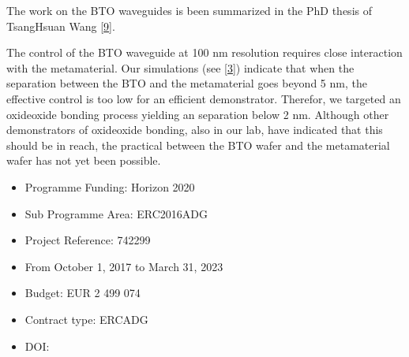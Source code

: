\documentclass[a4paper,10pt,english,openany,oneside]{jupyterBook}
\begin{document}
\sphinxAtStartPar
The work on the BTO waveguides is been summarized in the PhD thesis of Tsang\sphinxhyphen{}Hsuan Wang {[}\hyperlink{cite.bib:id3}{9}{]}.

\begin{DUlineblock}{0em}
\item[] 
\end{DUlineblock}

\sphinxAtStartPar
The control of the BTO waveguide at 100 nm resolution requires close interaction with the metamaterial. Our simulations (see {[}\hyperlink{cite.bib:id6}{3}{]}) indicate that when the separation between the BTO and the metamaterial goes beyond 5 nm, the effective control is too low for an efficient demonstrator. Therefor, we targeted an oxide\sphinxhyphen{}oxide bonding process yielding an separation below 2 nm. Although other demonstrators of oxide\sphinxhyphen{}oxide bonding, also in our lab, have indicated that this should be in reach, the practical between the BTO wafer and the metamaterial wafer has not yet been possible.

\begin{DUlineblock}{0em}
\item[] 
\end{DUlineblock}
\begin{itemize}
\item {} 
\sphinxAtStartPar
Programme Funding: Horizon 2020

\item {} 
\sphinxAtStartPar
Sub Programme Area: ERC\sphinxhyphen{}2016\sphinxhyphen{}ADG

\item {} 
\sphinxAtStartPar
Project Reference: 742299

\item {} 
\sphinxAtStartPar
From October 1, 2017 to March 31, 2023

\item {} 
\sphinxAtStartPar
Budget: EUR 2 499 074

\item {} 
\sphinxAtStartPar
Contract type: ERC\sphinxhyphen{}ADG

\item {} 
\sphinxAtStartPar
DOI: 

\end{itemize}

\sphinxstepscope
\end{document}
